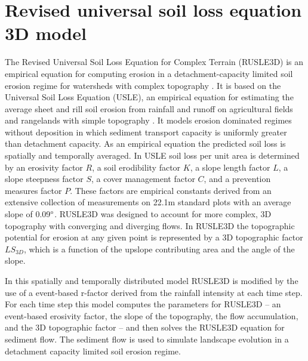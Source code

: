 \documentclass[final,3p,times,twocolumn]{elsarticle}
\begin{document}
\section{Revised universal soil loss equation 3D model}
\label{rusle_model} %
The Revised Universal Soil Loss Equation for Complex Terrain (RUSLE3D) 
is an empirical equation for computing erosion 
in a detachment-capacity limited soil erosion regime
for watersheds with complex topography \cite{Mitasova1996}. 
It is based on 
the Universal Soil Loss Equation (USLE),
an empirical equation for estimating the average
sheet and rill soil erosion from rainfall and runoff
on agricultural fields and rangelands with simple topography 
\cite{Wischmeier1978}. 
It models erosion dominated regimes without deposition
in which sediment transport capacity is uniformly greater than detachment capacity.
As an empirical equation the predicted soil loss 
is spatially and temporally averaged. 
In USLE soil loss per unit area is determined by 
an erosivity factor $R$,
a soil erodibility factor $K$, 
a slope length factor $L$,
a slope steepness factor $S$,
a cover management factor $C$,
and a prevention measures factor $P$.
These factors are empirical constants derived 
from an extensive collection of measurements 
on 22.1m standard plots with an average slope of 0.09$\degree$.  
%
RUSLE3D was designed to account for more complex, 3D topography 
with converging and diverging flows. 
In RUSLE3D the topographic potential for erosion at any given point 
is represented by a 3D topographic factor $LS_{3D}$,
which is a function of the upslope contributing area %
and the angle of the slope. 

In this spatially and temporally distributed model 
RUSLE3D is modified by the use of a 
event-based r-factor derived from the rainfall intensity at each time step.
%
For each time step
this model computes the parameters for RUSLE3D -- 
an event-based erosivity factor,
the slope of the topography, the flow accumulation, and
the 3D topographic factor -- and then
solves the RUSLE3D equation for sediment flow. 
The sediment flow is used to simulate landscape evolution 
in a detachment capacity limited soil erosion regime.

\end{document}
